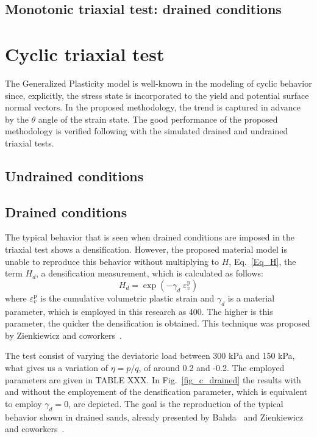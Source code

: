 \documentclass[preprint,12pt,a4paper]{elsarticle}
\begin{document}
\subsection{Monotonic triaxial test: drained conditions}
\label{sec:33}

\section{Cyclic triaxial test}
\label{sec:4}
The Generalized Plasticity model is well-known in the modeling of cyclic behavior since, explicitly, the stress state is incorporated to the yield and potential surface normal vectors. In the proposed methodology, the trend is captured in advance by the $\theta$ angle of the strain state. The good performance of the proposed methodology is verified following with the simulated drained and undrained triaxial tests.

\subsection{Undrained conditions}
\label{subsec:41}


\subsection{Drained conditions}
\label{subsec:42}
The typical behavior that is seen when drained conditions are imposed in the triaxial test shows a densification. However, the proposed material model is unable to reproduce this behavior without multiplying to $H$, Eq.~\eqref{Eq_H}, the term $H_d$, a densification measurement, which is calculated as follows:
\begin{equation}
H_{d}=\exp \left(-\gamma_{d} \; \varepsilon_{v}^{\mathrm{p}} \right)
\end{equation}
where $\varepsilon_{v}^{\mathrm{p}}$ is the cumulative volumetric plastic strain and $\gamma_{d}$ is a material parameter, which is employed in this research as 400. The higher is this parameter, the quicker the densification is obtained. This technique was proposed by Zienkiewicz and coworkers~\cite{Zienkiewicz99}.

The test consist of varying the deviatoric load between 300 kPa and 150 kPa, what gives us a variation of $\eta=p/q$, of around 0.2 and -0.2. The employed parameters are given in TABLE XXX. In Fig.~\ref{fig_c_drained} the results with and without the employement of the densification parameter, which is equivalent to employ $\gamma_{d}=0$, are depicted. The goal is the reproduction of the typical behavior shown in drained sands, already presented by Bahda~\cite{bahda1997} and Zienkiewicz and coworkers~\cite{Zienkiewicz99}. 
\end{document}
